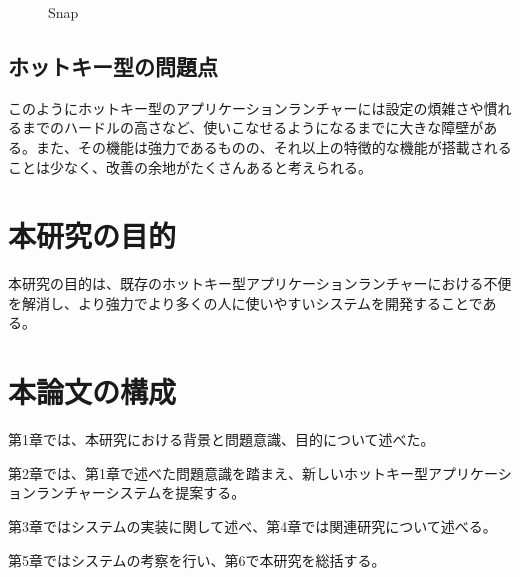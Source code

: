 \begin{figure}[h]
    \begin{center}
    \end{center}
    \caption{Snap}
    \label{fig:snap}
\end{figure}

\subsection{ホットキー型の問題点}
このようにホットキー型のアプリケーションランチャーには設定の煩雑さや慣れるまでのハードルの高さなど、使いこなせるようになるまでに大きな障壁がある。また、その機能は強力であるものの、それ以上の特徴的な機能が搭載されることは少なく、改善の余地がたくさんあると考えられる。

\section{本研究の目的}
本研究の目的は、既存のホットキー型アプリケーションランチャーにおける不便を解消し、より強力でより多くの人に使いやすいシステムを開発することである。

\section{本論文の構成}

第1章では、本研究における背景と問題意識、目的について述べた。

第2章では、第1章で述べた問題意識を踏まえ、新しいホットキー型アプリケーションランチャーシステムを提案する。

第3章ではシステムの実装に関して述べ、第4章では関連研究について述べる。

第5章ではシステムの考察を行い、第6で本研究を総括する。